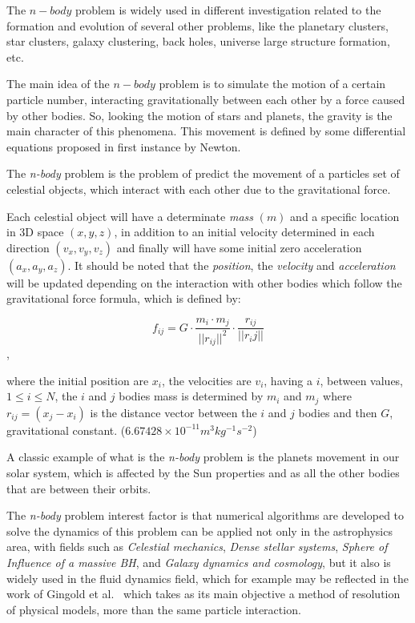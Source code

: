 The $n-body$ problem is widely used in different investigation
related to the formation and evolution of several other problems,
like the planetary clusters, star clusters, galaxy clustering, back holes,
universe large structure formation, etc.

The main idea of the $n-body$ problem is to simulate the
motion of a certain particle number, interacting gravitationally
between each other by a force caused by other bodies.
So, looking the motion of stars and planets, the gravity
is the main character of this phenomena.
This movement is defined by some differential equations
proposed in first instance by Newton.

The \emph{n-body} problem is the problem of
predict the movement of a particles set of celestial objects,
which interact with each other due to the gravitational force.

Each celestial object will have a determinate \emph{mass} $(m)$
and a specific location in 3D space
$(x, y, z)$, in addition to an initial velocity
determined in each direction $(v_{x}, v_{y}, v_{z})$ and finally
will have some initial zero acceleration $(a_{x}, a_{y}, a_{z})$.
It should be noted that the \emph{position}, the \emph{velocity} and \emph{acceleration}
will be updated depending on the interaction with other bodies
which follow the gravitational force formula,
which is defined by:

$$f_{ij} =G \cdot \frac{m_i \cdot m_j}{||r_{ij}||^{2}} \cdot \frac{r_{ij}}{||r_ij||}$$,

where the initial position are $x_{i}$,
the velocities are $v_{i}$,
having a $i$, between values, $1\leq i\leq N$,
the $i$ and $j$ bodies mass is determined by $m_{i}$ and $m_{j}$
where $r_{ij} = (x_{j} - x_{i})$ is the distance vector between the $i$ and $j$ bodies
and then $G$, gravitational constant. ($6.67428\times 10^{-11} m^{3} kg^{-1} s^{-2}$)

A classic example of what is the \emph{n-body} problem
is the planets movement in our solar system,
which is affected by the Sun properties
and as all the other bodies that are between their orbits.

The \emph{n-body} problem interest factor
is that numerical algorithms are developed to solve
the dynamics of this problem can be applied not only in the astrophysics area,
with fields such as \emph{Celestial mechanics}, \emph{Dense stellar systems},
\emph{Sphere of Influence of a massive BH}, and \emph{Galaxy dynamics and cosmology},
but it also is widely used in the fluid dynamics field,
which for example may be reflected in the work of Gingold et al.~\cite{Gingold}
which takes as its main objective a method of resolution of physical models,
more than the same particle interaction.

